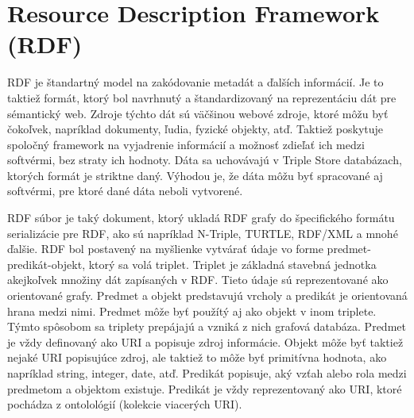 \documentclass[12pt, a4paper, oneside]{book}
\begin{document}


\section{Resource Description Framework (RDF)}

RDF \cite{rdf} je štandartný model na zakódovanie metadát a ďalších informácií. Je to taktiež formát, ktorý bol navrhnutý a štandardizovaný na reprezentáciu dát pre sémantický web. Zdroje týchto dát sú väčšinou webové zdroje, ktoré môžu byť čokoľvek, napríklad dokumenty, ľudia, fyzické objekty, atď. Taktiež poskytuje spoločný framework na vyjadrenie informácií a možnosť zdieľať ich medzi softvérmi, bez straty ich hodnoty. Dáta sa uchovávajú v Triple Store databázach, ktorých formát je striktne daný. Výhodou je, že dáta môžu byť spracované aj softvérmi, pre ktoré dané dáta neboli vytvorené.




RDF súbor je taký dokument, ktorý ukladá RDF grafy do špecifického formátu serializácie pre RDF, ako sú napríklad N-Triple, TURTLE, RDF/XML a mnohé ďalšie. RDF bol postavený na myšlienke vytvárať údaje vo forme predmet-predikát-objekt, ktorý sa volá triplet. Triplet je základná stavebná jednotka akejkoľvek množiny dát zapísaných v RDF. Tieto údaje sú reprezentované ako orientované grafy. Predmet a objekt predstavujú vrcholy a predikát je orientovaná hrana medzi nimi. Predmet môže byť použítý aj ako objekt v inom triplete. Týmto spôsobom sa triplety prepájajú a vzniká z nich grafová databáza. Predmet je vždy definovaný ako URI a popisuje zdroj informácie. Objekt môže byť taktiež nejaké URI popisujúce zdroj, ale taktiež to môže byť primitívna hodnota, ako napríklad string, integer, date, atď. Predikát popisuje, aký vzťah alebo rola medzi predmetom a objektom existuje. Predikát je vždy reprezentovaný ako URI, ktoré pochádza z ontolológií (kolekcie viacerých URI).
\end{document}
